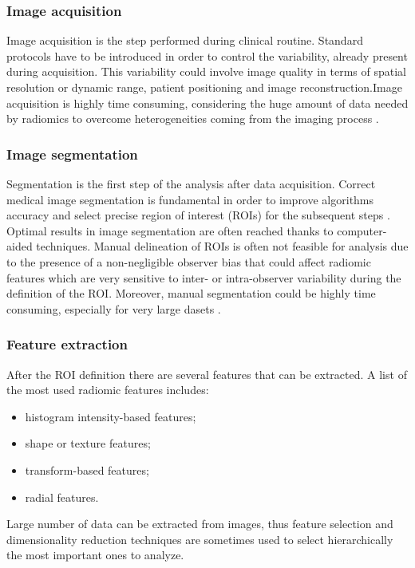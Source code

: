 \documentclass[../main.tex]{subfiles}
\begin{document}
\subsubsection{Image acquisition}

Image acquisition is the step performed during clinical routine. 
Standard protocols have to be introduced in order to control the variability, already present during acquisition. 
This variability could involve image quality in terms of spatial resolution or dynamic range, patient positioning and image reconstruction.Image acquisition is highly time consuming, considering the huge amount of data needed by radiomics to overcome heterogeneities coming from the imaging process \cite{kumar2012radiomics}.

\subsubsection{Image segmentation}

Segmentation is the first step of the analysis after data acquisition.
Correct medical image segmentation is fundamental in order to improve algorithms accuracy and select precise region of interest (ROIs) for the subsequent steps \cite{biondi2021classification}.
Optimal results in image segmentation are often reached thanks to computer-aided techniques. 
Manual delineation of ROIs is often not feasible for analysis due to the presence of a non-negligible observer bias that could affect radiomic features which are very sensitive to inter- or intra-observer variability during the definition of the ROI.
Moreover, manual segmentation could be  highly time consuming, especially for very large dasets \cite{van2020radiomics-guide}.

\subsubsection{Feature extraction}

After the ROI definition there are several features that can be extracted. 
A list of the most used radiomic features \cite{van2020radiomics-guide} includes: \begin{itemize}
    \item histogram intensity-based features;
    \item shape or texture features;
    \item transform-based features;
    \item radial features.
\end{itemize}   
Large number of data can be extracted from images, thus  feature selection and dimensionality reduction techniques are sometimes used to select hierarchically  the most important ones to analyze.
\end{document}
